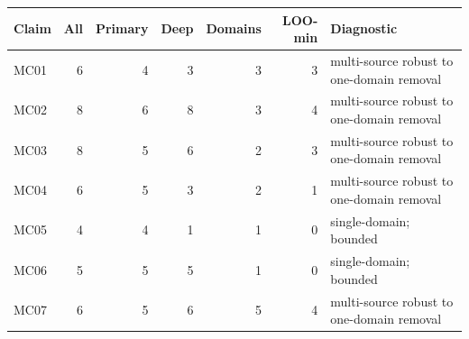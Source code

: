 \begin{tabular}{lrrrrrl}
Claim & All & Primary & Deep & Domains & LOO-min & Diagnostic \\
\hline
MC01 & 6 & 4 & 3 & 3 & 3 & multi-source robust to one-domain removal \\
MC02 & 8 & 6 & 8 & 3 & 4 & multi-source robust to one-domain removal \\
MC03 & 8 & 5 & 6 & 2 & 3 & multi-source robust to one-domain removal \\
MC04 & 6 & 5 & 3 & 2 & 1 & multi-source robust to one-domain removal \\
MC05 & 4 & 4 & 1 & 1 & 0 & single-domain; bounded \\
MC06 & 5 & 5 & 5 & 1 & 0 & single-domain; bounded \\
MC07 & 6 & 5 & 6 & 5 & 4 & multi-source robust to one-domain removal \\
\end{tabular}
